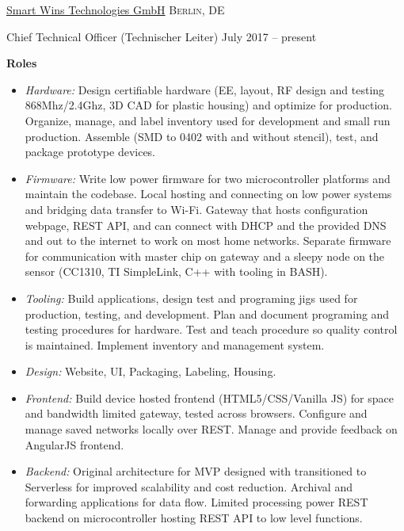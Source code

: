 \headedsection  %
  {\href{http://smartwins.de}{Smart Wins Technologies GmbH}}
  {\textsc{Berlin, DE}} {
  \headedsubsection
    {Chief Technical Officer (Technischer Leiter)}
    {July 2017 -- present}
    {

    \textbf{Roles}
    \begin{itemize}
      \renewcommand\labelitemi{--}
      \item \emph{Hardware:}
        Design certifiable hardware (EE, layout, RF design and testing 868Mhz/2.4Ghz, 3D CAD for plastic housing) and optimize for production. Organize, manage, and label inventory used for development and small run production. Assemble (SMD to 0402 with and without stencil), test, and package prototype devices.
      \item \emph{Firmware:}
        Write low power firmware for two microcontroller platforms and maintain the codebase. Local hosting and connecting on low power systems and bridging data transfer to Wi-Fi. Gateway that hosts configuration webpage, REST API, and can connect with DHCP and the provided DNS and out to the internet to work on most home networks. Separate firmware for communication with master chip on gateway and a sleepy node on the sensor (CC1310, TI SimpleLink, C++ with tooling in BASH).
      \item \emph{Tooling:}
        Build applications, design test and programing jigs used for production, testing, and development. Plan and document programing and testing procedures for hardware. Test and teach procedure so quality control is maintained. Implement inventory and management system.
      \item \emph{Design:}
        Website, UI, Packaging, Labeling, Housing.
      \item \emph{Frontend:}
        Build device hosted frontend (HTML5/CSS/Vanilla JS) for space and bandwidth limited gateway, tested across browsers. Configure and manage saved networks locally over REST. Manage and provide feedback on AngularJS frontend.
      \item \emph{Backend:}
        Original architecture for MVP designed with transitioned to Serverless for improved scalability and cost reduction. Archival and forwarding applications for data flow. Limited processing power REST backend on microcontroller hosting REST API to low level functions.

\end{itemize}}}
